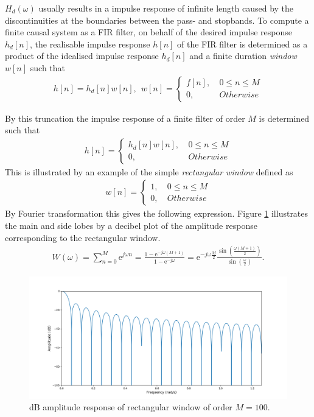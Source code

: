 $H_d(\omega)$ usually results in a impulse response of infinite length caused by the discontinuities at the boundaries between the pass- and stopbands. To compute a finite causal system as a FIR filter, on behalf of the desired impulse response $h_d[n]$, the realisable impulse response $h[n]$ of the FIR filter is determined as a product of the idealised impulse response $h_d[n]$ and a finite duration \textit{window} $w[n]$ such that
\begin{align}
h[n]=h_d[n]w[n], \ \ w[n] =
\left\{ \begin{matrix}
f[n], &\ 0 \leq n \leq M \\
0, &\ Otherwise
\end{matrix}\right.
\end{align}

By this truncation the impulse response of a finite filter of order $M$ is determined such that
\begin{align}
h[n]= 
\left\{ \begin{matrix}
h_d[n]w[n], &\ 0 \leq n \leq M \\
0, &\ Otherwise
\end{matrix}\right.
\end{align}
This is illustrated by an example of the simple \textit{rectangular window} defined as 
\begin{align}
w[n] =
\left\{ \begin{matrix}
1, &\ 0 \leq n \leq M \\
0, &\ Otherwise
\end{matrix}\right.
\end{align}
By Fourier transformation this gives the following expression. Figure \ref{fig:rect_db} illustrates the main and side lobes by a decibel plot of the amplitude response corresponding to the rectangular window.
\begin{align}
W \left(\omega\right)=\sum_{n=0}^{M} \text{e}^{j\omega n} = \frac{1- \text{e}^{-j\omega(M+1)}}{1- \text{e}^{-j\omega}} = \text{e}^{-j\omega \frac{M}{2}} \frac{ \sin \left( \frac{\omega \left( M+1 \right)}{2} \right)}{\sin \left( \frac{\omega}{2} \right)}.
\end{align}

\begin{figure}[H]
\centering
\includegraphics[width=\textwidth]{figures/dbplots/rect.png}
\caption{dB amplitude response of rectangular window of order $M=100$.}
\label{fig:rect_db}
\end{figure}

